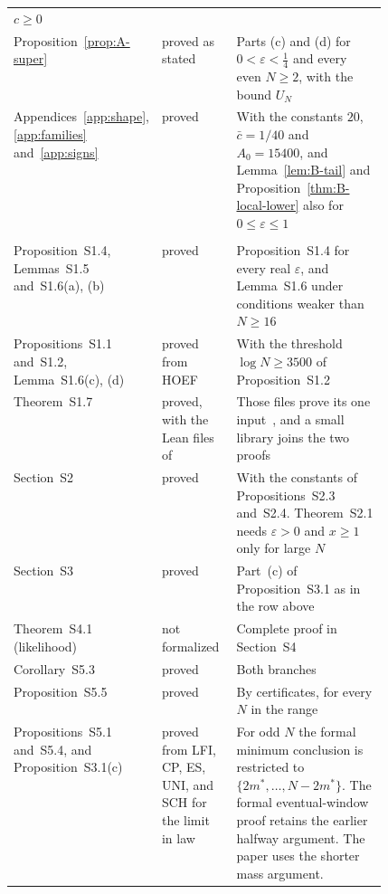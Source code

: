 \begin{table}[htbp]
\begin{tabular}{@{}>{\raggedright\arraybackslash}p{0.28\linewidth}>{\raggedright\arraybackslash}p{0.2\linewidth}>{\raggedright\arraybackslash}p{}@{}}
$c\ge0$\\
Proposition~\ref{prop:A-super} & proved as stated & Parts (c) and (d) for
$0<\varepsilon<\frac14$ and every even $N\ge2$, with the bound $U_N$\\
Appendices~\ref{app:shape}, \ref{app:families} and~\ref{app:signs} & proved & With the constants $20$, $\bar
c=1/40$ and $A_0=15400$, and Lemma~\ref{lem:B-tail} and Proposition~\ref{thm:B-local-lower}
also for $0\le\varepsilon\le1$\\
\midrule
\multicolumn{3}{@{}l}{\emph{Sections S1 to S5 of the arXiv version}}\\
Proposition~S1.4, Lemmas~S1.5 and~S1.6(a), (b) & proved & Proposition~S1.4 for every real
$\varepsilon$, and Lemma~S1.6 under conditions weaker than $N\ge16$\\
Propositions~S1.1 and~S1.2, Lemma~S1.6(c), (d) & proved from HOEF & With the threshold
$\log N\ge3500$ of Proposition~S1.2\\
Theorem~S1.7 & proved, with the Lean files of~\cite{paperA} & Those files
prove its one input~\cite[Prop.~3.8]{paperA}, and a small library joins the two proofs\\
Section~S2 & proved & With the constants of Propositions~S2.3 and~S2.4. Theorem~S2.1 needs
$\varepsilon>0$ and $x\ge1$ only for large $N$\\
Section~S3 & proved & Part~(c) of Proposition~S3.1 as in the row above\\
Theorem~S4.1 (likelihood) & not formalized & Complete proof in Section~S4\\
Corollary~S5.3 & proved & Both branches\\
Proposition~S5.5 & proved & By certificates, for every $N$ in the range\\
Propositions~S5.1 and~S5.4, and Proposition~S3.1(c) & proved from LFI, CP, ES, UNI,
and SCH for the limit in law & For odd $N$ the formal minimum conclusion is
restricted to $\{2m^*,\dots,N-2m^*\}$. The formal eventual-window proof retains
the earlier halfway argument. The paper uses the shorter mass argument.\\
\bottomrule
\end{tabular}
\end{table}

